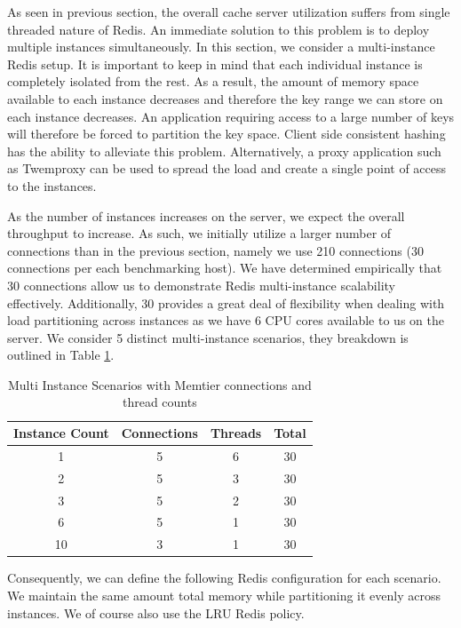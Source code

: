 As seen in previous section, the overall cache server utilization suffers from single threaded nature of Redis. An immediate solution to this problem is to deploy multiple instances simultaneously. In this section, we consider a multi-instance Redis setup. It is important to keep in mind that each individual instance is completely isolated from the rest. As a result, the amount of memory space available to each instance decreases and therefore the key range we can store on each instance decreases. An application requiring access to a large number of keys will therefore be forced to partition the key space. Client side consistent hashing has the ability to alleviate this problem. Alternatively, a proxy application such as Twemproxy \cite{twemproxy} can be used to spread the load and create a single point of access to the instances.

As the number of instances increases on the server, we expect the overall throughput to increase. As such, we initially utilize a larger number of connections than in the previous section, namely we use 210 connections (30 connections per each benchmarking host). We have determined empirically that 30 connections allow us to demonstrate Redis multi-instance scalability effectively. Additionally, 30 provides a great deal of flexibility when dealing with load partitioning across instances as we have 6 CPU cores available to us on the server. We consider 5 distinct multi-instance scenarios, they breakdown is outlined in Table \ref{tab:redis_instances}.

\begin{table}[h!]
\centering
\begin{tabular}{| c c c c |}
 \hline
 Instance Count & Connections & Threads & Total\\ [0.5ex]
 \hline\hline

 1  & 5 & 6 & 30 \\
 2  & 5 & 3 & 30 \\
 3  & 5 & 2 & 30 \\
 6  & 5 & 1 & 30 \\
 10 & 3 & 1 & 30 \\
 \hline

\end{tabular}
\caption{Multi Instance Scenarios with Memtier connections and thread counts}
\label{tab:redis_instances}
\end{table}

Consequently, we can define the following Redis configuration for each scenario. We maintain the same amount total memory while partitioning it evenly across instances. We of course also use the LRU Redis policy.


